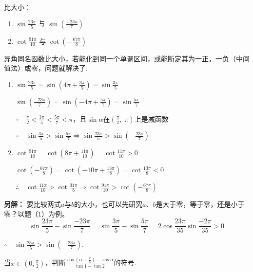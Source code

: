 \begin{example}
    比大小：
\begin{enumerate}[(1)]
    \item $\sin\frac{23\pi}{5}$ 与 $\sin\left(\frac{-23\pi}{7}\right)$
    \item $\cot\frac{91\pi}{10}$ 与 $\cot\left(-\frac{67\pi}{8}\right)$
\end{enumerate}
\end{example}

\begin{analyze}
异角同名函数比大小，若能化到同一个单调区间，或能断定其为一正，一负（中间值法）或零，问题就解决了.
\end{analyze}

\begin{solution}
\begin{enumerate}
    \item $\sin\frac{23\pi}{5}=\sin\left(4\pi+\frac{3\pi}{5}\right)=\sin\frac{3\pi}{5}$

$\sin\left(\frac{-23\pi}{7}\right)=\sin\left(-4\pi+\frac{5\pi}{7}\right)=\sin\frac{5\pi}{7}$

$\because\quad \frac{\pi}{2}<\frac{3\pi}{5}<\frac{5\pi}{7}<\pi$，且$\sin\alpha$在$\left(\frac{\pi}{2},\; \pi\right)$上是减函数

$\therefore\quad \sin\frac{3\pi}{5}>\sin\frac{5\pi}{7} \Longrightarrow \sin\frac{23\pi}{5}>\sin\left(-\frac{23\pi}{7}\right)$

\item $\cot\frac{91\pi}{10}=\cot\left(8\pi+\frac{11\pi}{10}\right)=\cot\frac{11\pi}{10}>0$

$\cot\left(-\frac{67\pi}{8}\right)=\cot\left(-10\pi+\frac{13\pi}{8}\right)=\cot\frac{13\pi}{8}<0$

$\therefore\quad \cot\frac{11\pi}{10}>\cot\frac{31\pi}{8}\Longrightarrow \cot\frac{91\pi}{10}>\cot\left(-\frac{67\pi}{8}\right)$
\end{enumerate}    

\textbf{另解：} 要比较两式$a$与$b$的大小，也可以先研究$a$、$b$是大于零，等于零，还是小于零？以题（1）为例。
\[\sin\frac{23\pi}{5}-\sin\frac{-23\pi}{7}=\sin\frac{3\pi}{5}-\sin\frac{5\pi}{7}=2\cos\frac{23\pi}{35}\sin\frac{-2\pi}{35}>0\]

$\therefore\quad \sin\frac{23\pi}{5}>\sin\left(-\frac{23\pi}{7}\right)$.
\end{solution}

\begin{example}
当$x\in\left(0,\frac{\pi}{2}\right)$，判断$\frac{\cos\left(\alpha+\frac{\pi}{6}\right)-\cos \alpha}{\tan 1-\tan 2}$的符号.
\end{example}

